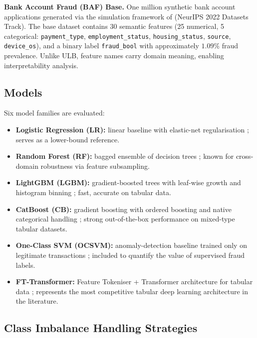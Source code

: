 \documentclass[a4paper,fleqn]{cas-sc}
\begin{document}
\textbf{Bank Account Fraud (BAF) Base.}
One million synthetic bank account applications generated via the
simulation framework of \citet{jesus2022turning} (NeurIPS 2022 Datasets Track).
The base dataset contains 30 semantic features (25 numerical, 5 categorical:
\texttt{payment\_type}, \texttt{employment\_status}, \texttt{housing\_status},
\texttt{source}, \texttt{device\_os}), and a binary label \texttt{fraud\_bool}
with approximately $1.09\%$ fraud prevalence.
Unlike ULB, feature names carry domain meaning, enabling interpretability analysis.

\subsection{Models}
\label{subsec:models}

Six model families are evaluated:
\begin{itemize}[nosep]
  \item \textbf{Logistic Regression (LR):} linear baseline with elastic-net regularisation
    \citep{tibshirani1996regression}; serves as a lower-bound reference.
  \item \textbf{Random Forest (RF):} bagged ensemble of decision trees
    \citep{breiman2001random}; known for cross-domain robustness via feature subsampling.
  \item \textbf{LightGBM (LGBM):} gradient-boosted trees with leaf-wise growth and
    histogram binning \citep{ke2017lightgbm}; fast, accurate on tabular data.
  \item \textbf{CatBoost (CB):} gradient boosting with ordered boosting and native
    categorical handling \citep{prokhorenkova2018catboost}; strong out-of-the-box
    performance on mixed-type tabular datasets.
  \item \textbf{One-Class SVM (OCSVM):} anomaly-detection baseline trained only on
    legitimate transactions \citep{scholkopf2001estimating}; included to quantify the
    value of supervised fraud labels.
  \item \textbf{FT-Transformer:} Feature Tokeniser + Transformer architecture for tabular
    data \citep{gorishniy2021revisiting}; represents the most competitive tabular
    deep learning architecture in the literature.
\end{itemize}

\subsection{Class Imbalance Handling Strategies}
\label{subsec:strategies}
\end{document}
